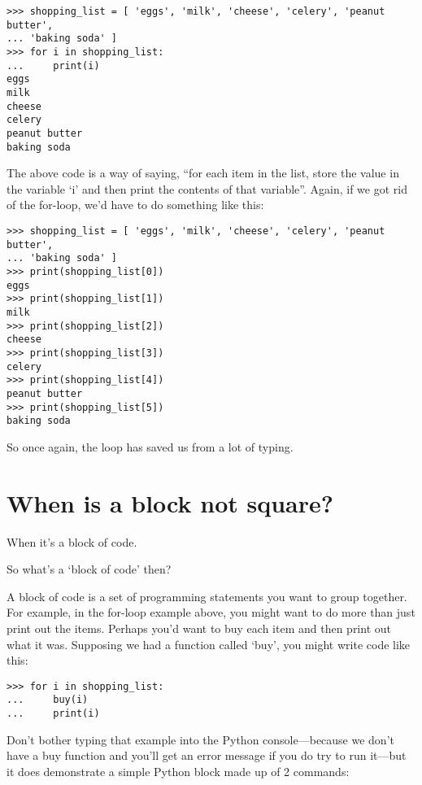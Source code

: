 \begin{listing}
\begin{verbatim}
>>> shopping_list = [ 'eggs', 'milk', 'cheese', 'celery', 'peanut butter', 
... 'baking soda' ]
>>> for i in shopping_list:
...     print(i)
eggs
milk
cheese
celery
peanut butter
baking soda
\end{verbatim}
\end{listing}

The above code is a way of saying, ``for each item in the list, store the value in the variable `i' and then print the contents of that variable''.  Again, if we got rid of the for-loop, we'd have to do something like this:

\begin{listing}
\begin{verbatim}
>>> shopping_list = [ 'eggs', 'milk', 'cheese', 'celery', 'peanut butter', 
... 'baking soda' ]
>>> print(shopping_list[0])
eggs
>>> print(shopping_list[1])
milk
>>> print(shopping_list[2])
cheese
>>> print(shopping_list[3])
celery
>>> print(shopping_list[4])
peanut butter
>>> print(shopping_list[5])
baking soda
\end{verbatim}
\end{listing}

So once again, the loop has saved us from a lot of typing.

\section{When is a block not square?}

When it's a block of code.
\par
\noindent
So what's a `block of code' then?
\par
A block of code is a set of programming statements you want to group together.  For example, in the for-loop example above, you might want to do more than just print out the items.  Perhaps you'd want to buy each item and then print out what it was.  Supposing we had a function called `buy', you might write code like this:

\begin{listing}
\begin{verbatim}
>>> for i in shopping_list:
...     buy(i)
...     print(i)
\end{verbatim}
\end{listing}

Don't bother typing that example into the Python console---because we don't have a buy function and you'll get an error message if you do try to run it---but it does demonstrate a simple Python block made up of 2 commands:

